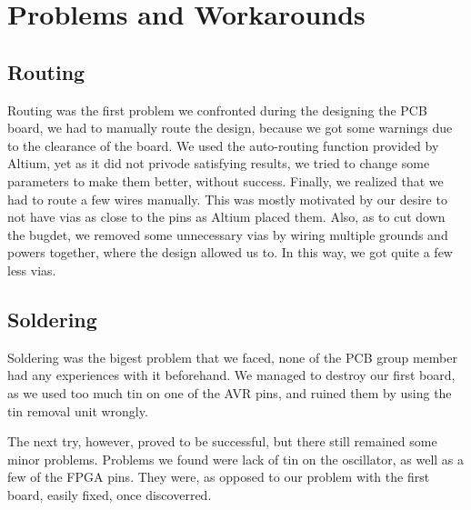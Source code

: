 \section {Problems and Workarounds}
\subsection{Routing}
Routing was the first problem we confronted during the designing the PCB board, we had to manually route the design, because we got some warnings due to the clearance of the board. We used the auto-routing function provided by Altium, 
yet as it did not privode satisfying results, we tried to change some parameters to make them better, without success. Finally, we realized that we had to route a few wires manually. This was mostly motivated by our desire to not have vias as close to the pins as Altium placed them. Also, as to cut down the bugdet, we removed some unnecessary vias by wiring multiple grounds and powers together, where the design allowed us to. In this way, we got quite a few less vias. 
\subsection{Soldering}
Soldering was the bigest problem that we faced, none of the PCB group member had any experiences with it beforehand. We managed to destroy our first board, as we used too much tin on one of the AVR pins, and ruined them by using the tin removal unit wrongly.

The next try, however, proved to be successful, but there still remained some minor problems. Problems we found were lack of tin on the oscillator, as well as a few of the FPGA pins. They were, as opposed to our problem with the first board, easily fixed, once discoverred.



